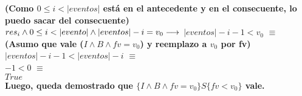 \documentclass[10pt,a4paper]{article}
\begin{document}
\begin{flushleft}
\begin{enumerate}
	\vspace{2mm}
	\textbf{(Como $0 \leq i <|eventos|$ está en el antecedente y en el consecuente, lo puedo sacar del consecuente)}\\
	\vspace{2mm}
	$res_i \wedge 0\leq i<|evento| \wedge |eventos|-i = v_0 \implica$ $|eventos|-i-1<v_0$ $\equiv$ \\
	\vspace{2mm}
	\textbf{(Asumo que vale ($I \wedge B \wedge fv= v_0$) y reemplazo a $v_0$ por fv)}\\
	\vspace{2mm}
	$|eventos|-i-1<|eventos|-i$ $\equiv$ \\
	\vspace{2mm}
	$-1<0 $ $\equiv$ \\
	\vspace{2mm}
	$True $ \\
	\vspace{4mm}
	\textbf{Luego, queda demostrado que $\{ I \wedge B \wedge fv= v_0 \}S\{ fv<v_0 \}$ vale.}


\end{enumerate}
\end{flushleft}
\end{document}
